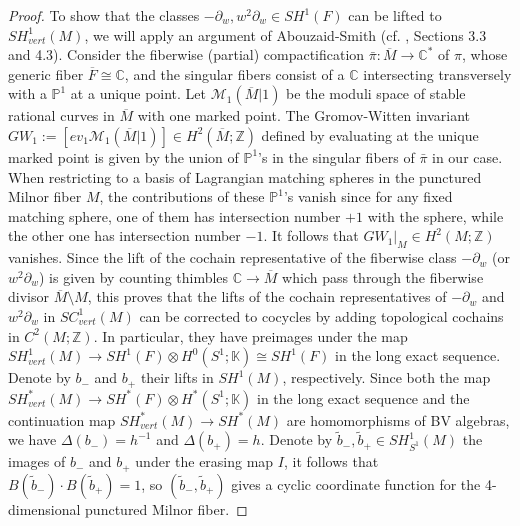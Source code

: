 \documentclass[a4paper]{article}
\numberwithin{equation}{section}
\begin{document}
\begin{proof}
To show that the classes $-\partial_w,w^2\partial_w\in\mathit{SH}^1(F)$ can be lifted to $\mathit{SH}^1_\mathit{vert}(M)$, we will apply an argument of Abouzaid-Smith (cf. \cite{asm1}, Sections 3.3 and 4.3). Consider the fiberwise (partial) compactification $\bar{\pi}:\overline{M}\rightarrow\mathbb{C}^\ast$ of $\pi$, whose generic fiber $\overline{F}\cong\mathbb{C}$, and the singular fibers consist of a $\mathbb{C}$ intersecting transversely with a $\mathbb{P}^1$ at a unique point. Let $\mathcal{M}_1(\overline{M}|1)$ be the moduli space of stable rational curves in $\overline{M}$ with one marked point. The Gromov-Witten invariant $\mathit{GW}_1:=\left[\mathit{ev}_1\mathcal{M}_1(\overline{M}|1)\right]\in H^2(\overline{M};\mathbb{Z})$ defined by evaluating at the unique marked point is given by the union of $\mathbb{P}^1$'s in the singular fibers of $\bar{\pi}$ in our case. When restricting to a basis of Lagrangian matching spheres in the punctured Milnor fiber $M$, the contributions of these $\mathbb{P}^1$'s vanish since for any fixed matching sphere, one of them has intersection number $+1$ with the sphere, while the other one has intersection number $-1$. It follows that $\mathit{GW}_1|_M\in H^2(M;\mathbb{Z})$ vanishes. Since the lift of the cochain representative of the fiberwise class $-\partial_w$ (or $w^2\partial_w$) is given by counting thimbles $\mathbb{C}\rightarrow\overline{M}$ which pass through the fiberwise divisor $\overline{M}\setminus M$, this proves that the lifts of the cochain representatives of $-\partial_w$ and $w^2\partial_w$ in $\mathit{SC}^1_\mathit{vert}(M)$ can be corrected to cocycles by adding topological cochains in $C^2(M;\mathbb{Z})$. In particular, they have preimages under the map $\mathit{SH}^1_\mathit{vert}(M)\rightarrow\mathit{SH}^1(F)\otimes H^0(S^1;\mathbb{K})\cong\mathit{SH}^1(F)$ in the long exact sequence. Denote by $b_-$ and $b_+$ their lifts in $\mathit{SH}^1(M)$, respectively. Since both the map $\mathit{SH}^\ast_\mathit{vert}(M)\rightarrow\mathit{SH}^\ast(F)\otimes H^\ast(S^1;\mathbb{K})$ in the long exact sequence and the continuation map $\mathit{SH}^\ast_\mathit{vert}(M)\rightarrow\mathit{SH}^\ast(M)$ are homomorphisms of BV algebras, we have $\Delta(b_-)=h^{-1}$ and $\Delta(b_+)=h$. Denote by $\tilde{b}_-,\tilde{b}_+\in\mathit{SH}_{S^1}^1(M)$ the images of $b_-$ and $b_+$ under the erasing map $I$, it follows that $B(\tilde{b}_-)\cdot B(\tilde{b}_+)=1$, so $(\tilde{b}_-,\tilde{b}_+)$ gives a cyclic coordinate function for the 4-dimensional punctured Milnor fiber.
\end{proof}
\end{document}

